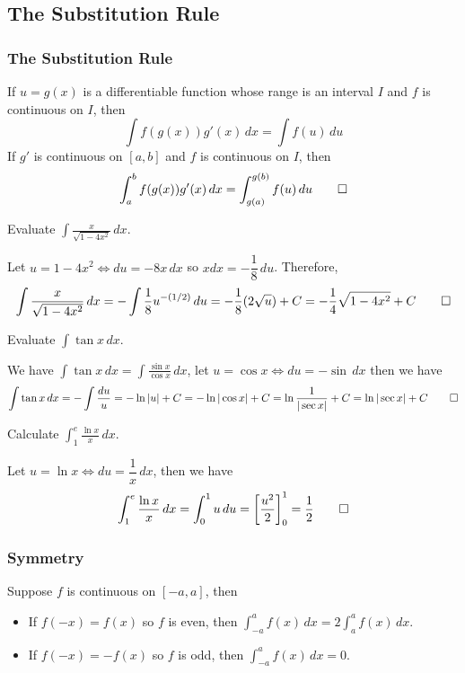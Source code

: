 \subsection{The Substitution Rule}
\subsubsection{The Substitution Rule}
\begin{theorem}
    If \(u=g(x)\) is a differentiable function whose range is an interval
    \(I\) and \(f\) is continuous on \(I\),
    then \[\int f(g(x))g'(x)\,dx=\int f(u)\,du\]
    If \(g'\) is continuous on \([a,b]\) and \(f\) is continuous on \(I\),
    then \[\int_a^b f(g(x))g'(x)\,dx=\int_{g(a)}^{g(b)} f(u)\,du\qedhere\]
\end{theorem}
\begin{problem}
    Evaluate \(\displaystyle{\int\frac{x}{\sqrt{1-4x^2}}\,dx}\).
\end{problem}
\begin{solution}
    Let \(u=1-4x^2\iff du=-8x\,dx\) so \(xdx=-\dfrac{1}{8}\,du\).
    Therefore,
    \[\int\frac{x}{\sqrt{1-4x^2}}\,dx=-\int\frac{1}{8}u^{-(1/2)}\,du
    =-\frac{1}{8}(2\sqrt{u})+C=-\frac{1}{4}\sqrt{1-4x^2}+C\qedhere\]
\end{solution}
\begin{problem}
    Evaluate \(\displaystyle{\int\tan x\,dx}\).
\end{problem}
\begin{solution}
    We have \(\displaystyle{\int\tan x\,dx=\int\frac{\sin x}{\cos x}}\,dx\),
    let \(u=\cos x \iff du=-\sin\,dx\) then we have
    \[\int\tan x\,dx=-\int\frac{du}{u}=-\ln|u|+C=-\ln|\cos x|+C
    =\ln\frac{1}{|\sec x|}+C=\ln|\sec x|+C\qedhere\]
\end{solution}
\begin{problem}
    Calculate \(\displaystyle{\int_1^e \frac{\ln x}{x}\,dx}\).
\end{problem}
\begin{solution}
    Let \(u=\ln x\iff du=\dfrac{1}{x}\,dx\), then we have
    \[\int_1^e \frac{\ln x}{x}\,dx=\int_0^1 u\,du
    =\left[\frac{u^2}{2}\right]_0^1=\frac{1}{2}\qedhere\]
\end{solution}

\subsubsection{Symmetry}
\begin{theorem}
    Suppose \(f\) is continuous on \([-a,a]\), then
    \begin{itemize}
        \item If \(f(-x)=f(x)\) so \(f\) is even, then
        \(\displaystyle{\int_{-a}^a f(x)\,dx=2\int_a^a f(x)\,dx}\).
        \item If \(f(-x)=-f(x)\) so \(f\) is odd, then
        \(\displaystyle{\int_{-a}^a f(x)\,dx=0}\).\qedhere
    \end{itemize}
\end{theorem}